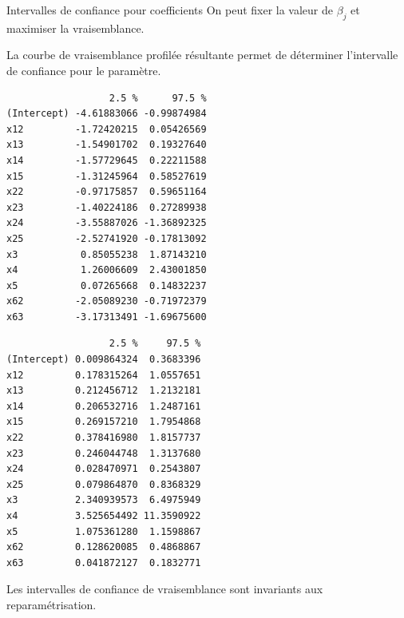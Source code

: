\documentclass[
  ignorenonframetext,
]{beamer}
\begin{document}
\begin{frame}[fragile]{Intervalles de confiance pour coefficients}
\protect\hypertarget{intervalles-de-confiance-pour-coefficients}{}
On peut fixer la valeur de \(\beta_j\) et maximiser la vraisemblance.

La courbe de vraisemblance profilée résultante permet de déterminer
l'intervalle de confiance pour le paramètre.

\begin{verbatim}
                  2.5 %      97.5 %
(Intercept) -4.61883066 -0.99874984
x12         -1.72420215  0.05426569
x13         -1.54901702  0.19327640
x14         -1.57729645  0.22211588
x15         -1.31245964  0.58527619
x22         -0.97175857  0.59651164
x23         -1.40224186  0.27289938
x24         -3.55887026 -1.36892325
x25         -2.52741920 -0.17813092
x3           0.85055238  1.87143210
x4           1.26006609  2.43001850
x5           0.07265668  0.14832237
x62         -2.05089230 -0.71972379
x63         -3.17313491 -1.69675600
\end{verbatim}

\begin{verbatim}
                  2.5 %     97.5 %
(Intercept) 0.009864324  0.3683396
x12         0.178315264  1.0557651
x13         0.212456712  1.2132181
x14         0.206532716  1.2487161
x15         0.269157210  1.7954868
x22         0.378416980  1.8157737
x23         0.246044748  1.3137680
x24         0.028470971  0.2543807
x25         0.079864870  0.8368329
x3          2.340939573  6.4975949
x4          3.525654492 11.3590922
x5          1.075361280  1.1598867
x62         0.128620085  0.4868867
x63         0.041872127  0.1832771
\end{verbatim}

Les intervalles de confiance de vraisemblance sont invariants aux
reparamétrisation.
\end{frame}
\end{document}

